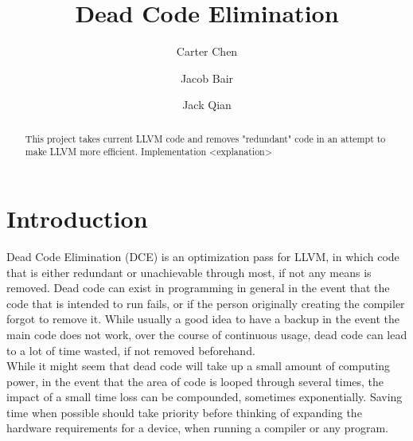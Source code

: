 \documentclass[sigplan,screen]{acmart}
\begin{document}
\title{Dead Code Elimination} 
\author{Carter Chen}

\author{Jacob Bair}

\author{Jack Qian}

\begin{abstract}
  This project takes current LLVM code and removes "redundant" code in an attempt to make LLVM more efficient. Implementation <explanation>
\end{abstract}




\maketitle

\section{Introduction}
    Dead Code Elimination (DCE) is an optimization pass for LLVM, in which code that is either redundant or unachievable through most, if not any means is removed. Dead code can exist in programming in general in the event that the code that is intended to run fails, or if the person originally creating the compiler forgot to remove it. While usually a good idea to have a backup in the event the main code does not work, over the course of continuous usage, dead code can lead to a lot of time wasted, if not removed beforehand.\\
    \intent While it might seem that dead code will take up a small amount of computing power, in the event that the area of code is looped through several times, the impact of a small time loss can be compounded, sometimes exponentially. Saving time when possible should take priority before thinking of expanding the hardware requirements for a device, when running a compiler or any program.
    
\end{document}
